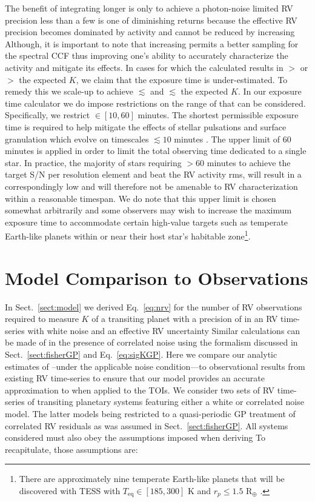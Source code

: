 The benefit of integrating longer is only to achieve a photon-noise
limited RV precision less than a few \sigact{,} is one of diminishing returns because the effective RV precision
becomes dominated by activity and cannot be reduced by increasing  Although, it is important to note that
increasing \texp{} permits a better sampling for the spectral CCF thus improving one's ability to accurately
characterize the activity and mitigate its effects. In cases for which
the calculated \texp{} results in \sigRV{} $>$ \sigact{} or
$>$ the expected $K$, we claim that the exposure time is under-estimated. To remedy this we
scale-up \texp{} to achieve \sigRV{} $\lesssim$ \sigact{} and $\lesssim$ the expected $K$.
In our exposure time calculator 
we do impose restrictions on the range of \texp{} that can be considered. Specifically, we restrict
\texp{} $\in [10,60]$ minutes. The shortest permissible exposure time is required to help mitigate
the effects of stellar pulsations and surface granulation which evolve on timescales $\lesssim 10$ minutes
\citep{lovis05, dumusque11}.
The upper limit of 60 minutes is applied in order to limit the total observing time dedicated to a single star.
In practice, the majority of stars requiring $>60$ minutes to achieve the target S/N per resolution element and
beat the RV activity rms,
will result in a correspondingly low \sigK{} and will therefore not be amenable to RV 
characterization within a reasonable timespan.
We do note that this upper limit is chosen somewhat arbitrarily and some observers may wish to increase the
maximum exposure time 
to accommodate certain high-value targets such as temperate Earth-like planets within or
near their host star's habitable zone\footnote{There are approximately nine temperate Earth-like planets
  that will be discovered
  with TESS with $T_{\text{eq}} \in [185,300]$ K and $r_p \leq 1.5$ R$_{\oplus}$ .}.


\section{Model Comparison to Observations}  \label{sect:accuracy}
In Sect.~\ref{sect:model} we derived Eq.~\ref{eq:nrv} for the number of RV observations required to measure
$K$ of a transiting planet with a precision of \sigK{} in an RV time-series with white noise and an
effective RV uncertainty  Similar calculations can be made of \sigK{(}\nrv{)} in the presence of
correlated noise using the formalism discussed in Sect.~\ref{sect:fisherGP} and Eq.~\ref{eq:sigKGP}. 
Here we compare our analytic estimates of \nrv{-}--under the applicable noise condition---to
observational results from existing RV time-series to ensure that our model provides
an accurate approximation to \nrv{} when applied to the TOIs. We consider two sets of RV time-series
of transiting planetary systems featuring either a white or correlated noise model. The latter models being
restricted to a quasi-periodic GP treatment of correlated RV residuals as was assumed in Sect.~\ref{sect:fisherGP}.
All systems considered must also obey the
assumptions imposed when deriving  To recapitulate, those assumptions are:

